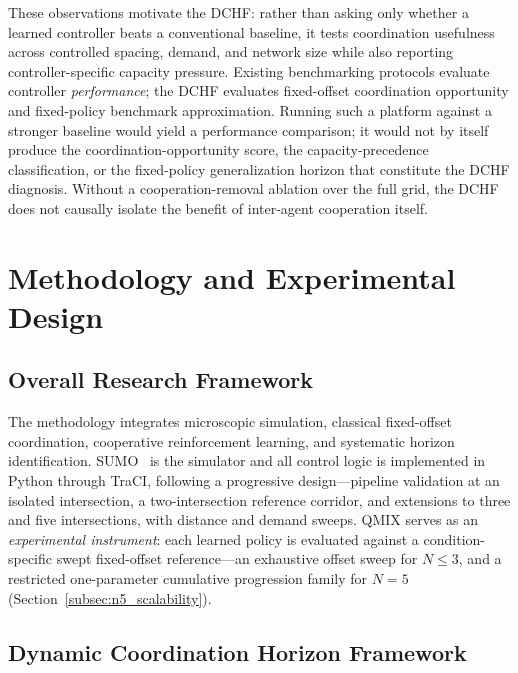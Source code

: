 \documentclass[review,12pt]{elsarticle}
\begin{document}
These observations motivate the DCHF: rather than asking only whether a
learned controller beats a conventional baseline, it tests coordination
usefulness across controlled spacing, demand, and network size while also
reporting controller-specific capacity pressure. Existing benchmarking
protocols evaluate controller \emph{performance}; the DCHF evaluates
fixed-offset coordination opportunity and fixed-policy benchmark
approximation. Running such a platform against a stronger baseline would
yield a performance comparison; it would not by itself produce the
coordination-opportunity score, the capacity-precedence classification, or
the fixed-policy generalization horizon that constitute the DCHF diagnosis.
Without a cooperation-removal ablation over the full grid,
the DCHF does not causally isolate the benefit of inter-agent cooperation itself.

\section{Methodology and Experimental Design}
\label{sec:methodology}

\subsection{Overall Research Framework}
\label{subsec:overall_framework}

The methodology integrates microscopic simulation, classical fixed-offset coordination, cooperative reinforcement learning, and systematic horizon identification. SUMO~\cite{Lopez2018} is the simulator and all control logic is implemented in Python through TraCI, following a progressive design---pipeline validation at an isolated intersection, a two-intersection reference corridor, and extensions to three and five intersections, with distance and demand sweeps. QMIX serves as an \textit{experimental instrument}: each learned policy is evaluated against a condition-specific swept fixed-offset reference---an exhaustive offset sweep for $N\leq3$, and a restricted one-parameter cumulative progression family for $N=5$ (Section~\ref{subsec:n5_scalability}).

\subsection{Dynamic Coordination Horizon Framework}
\label{subsec:dchf}
\end{document}
